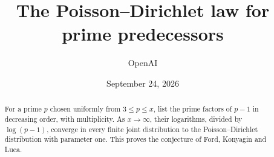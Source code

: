 \documentclass[11pt]{article}
\title{The Poisson--Dirichlet law for prime predecessors}
\author{OpenAI}
\date{September 24, 2026}
\begin{document}
\maketitle
\begin{abstract}
For a prime $p$ chosen uniformly from $3\le p\le x$, list the prime factors of $p-1$ in decreasing order, with multiplicity. As $x\to\infty$, their logarithms, divided by $\log(p-1)$, converge in every finite joint distribution to the Poisson--Dirichlet distribution with parameter one. This proves the conjecture of Ford, Konyagin and Luca.
\end{abstract}
\tableofcontents








\appendix

\clearpage
{}
{}
\begingroup
\raggedright


\endgroup
\end{document}
